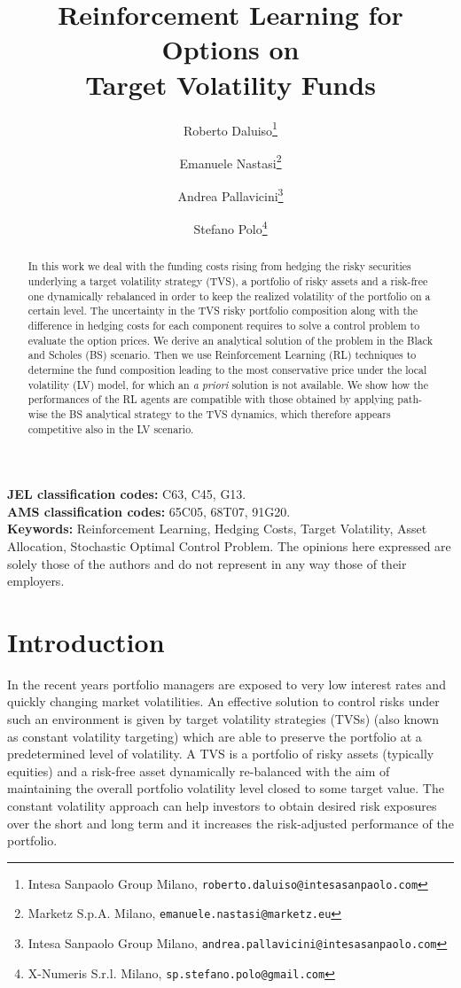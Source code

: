\documentclass[11pt]{article}
\date{}
\title{Reinforcement Learning for Options on \\Target Volatility Funds}
\author{
	Roberto Daluiso\thanks{Intesa Sanpaolo Group Milano, \texttt{roberto.daluiso@intesasanpaolo.com}}
	\and 
	Emanuele Nastasi\thanks{Marketz S.p.A. Milano, \texttt{emanuele.nastasi@marketz.eu}}
	\and Andrea Pallavicini\thanks{Intesa Sanpaolo Group Milano, \texttt{andrea.pallavicini@intesasanpaolo.com}} 
	\and
	Stefano Polo\thanks{X-Numeris S.r.l. Milano, \texttt{sp.stefano.polo@gmail.com}} 
}
\begin{document}

\maketitle

\begin{abstract}
\footnotesize	
\noindent
In this work we deal with the funding costs rising from hedging the risky securities underlying a target volatility strategy (TVS), a portfolio of risky assets and a risk-free one dynamically rebalanced in order to keep the realized volatility of the portfolio on a certain level. The uncertainty in the TVS risky portfolio composition along with the difference in hedging costs for each component requires to solve a control problem to evaluate the option prices. We derive an analytical solution of the problem in the Black and Scholes (BS) scenario. Then we use Reinforcement Learning (RL) techniques to determine the fund composition leading to the most conservative price under the local volatility (LV) model, for which an \textit{a priori} solution is not available. We show how the performances of the RL agents are compatible with those obtained by applying path-wise the BS analytical strategy to the TVS dynamics, which therefore appears competitive also in the LV scenario.
\end{abstract}
\smallskip
\noindent
\textbf{JEL classification codes:} C63, C45, G13.\\
\textbf{AMS classification codes:} 65C05, 68T07, 91G20.\\
\textbf{Keywords:} Reinforcement Learning, Hedging Costs, Target Volatility, Asset Allocation, Stochastic Optimal Control Problem. 
\newpage
\tableofcontents
 \mbox{}
 \vfill
 \noindent \small The opinions here expressed are solely those of the authors and do not represent in any way those of their employers.

\newpage
\pagestyle{myheadings} 


\section{Introduction}
In the recent years portfolio managers are exposed to very low interest rates and quickly changing market volatilities. An effective solution to control risks under such an environment is given by target volatility strategies (TVSs) (also known as constant volatility targeting) which are able to preserve the portfolio at a predetermined level of volatility. A TVS is a portfolio of risky assets (typically  equities) and a risk-free asset dynamically re-balanced with the aim of maintaining the overall portfolio volatility level closed to some target value. The constant volatility approach can help investors to obtain desired risk exposures over the short and long term and it increases the risk-adjusted performance of the portfolio.
\end{document}
